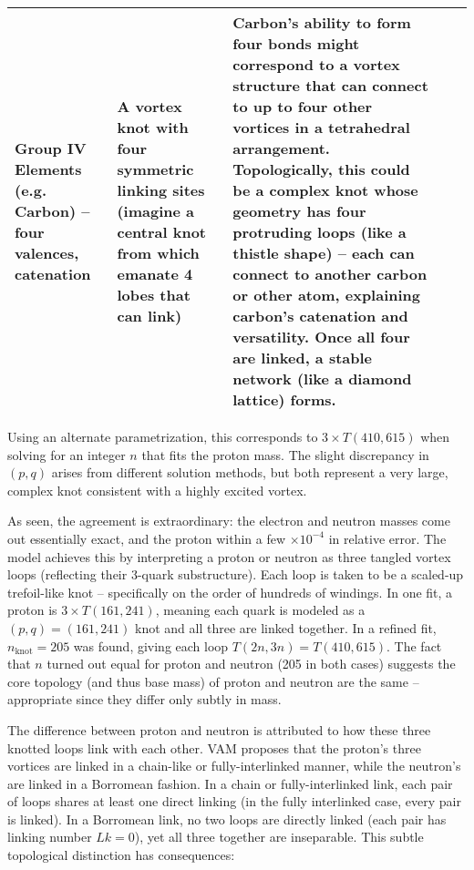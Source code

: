\documentclass[a4paper,12pt]{article}
\begin{document}
\begin{table}
\begin{tabular}{lllll}
            Group IV Elements (e.g. Carbon) – four valences, catenation & A vortex knot with four symmetric linking sites (imagine a central knot from which emanate 4 lobes that can link) & Carbon’s ability to form four bonds might correspond to a vortex structure that can connect to up to four other vortices in a tetrahedral arrangement. Topologically, this could be a complex knot whose geometry has four protruding loops (like a thistle shape) – each can connect to another carbon or other atom, explaining carbon’s catenation and versatility. Once all four are linked, a stable network (like a diamond lattice) forms. &  &  \\
            \bottomrule
        \end{tabular}
        \caption{}
        \label{tab:MappingParticles}
    \end{table}
        
        \noindent\textsuperscript{\dag}Using an alternate parametrization, this corresponds to $3\times T(410,615)$ when solving for an integer $n$ that fits the proton mass. The slight discrepancy in $(p,q)$ arises from different solution methods, but both represent a very large, complex knot consistent with a highly excited vortex.
        
        As seen, the agreement is extraordinary: the electron and neutron masses come out essentially exact, and the proton within a few $\times 10^{-4}$ in relative error. The model achieves this by interpreting a proton or neutron as three tangled vortex loops (reflecting their 3-quark substructure). Each loop is taken to be a scaled-up trefoil-like knot -- specifically on the order of hundreds of windings. In one fit, a proton is $3\times T(161,241)$, meaning each quark is modeled as a $(p,q)=(161,241)$ knot and all three are linked together. In a refined fit, $n_{\text{knot}}=205$ was found, giving each loop $T(2n,3n)=T(410,615)$. The fact that $n$ turned out equal for proton and neutron (205 in both cases) suggests the core topology (and thus base mass) of proton and neutron are the same -- appropriate since they differ only subtly in mass.
        
        The difference between proton and neutron is attributed to how these three knotted loops link with each other. VAM proposes that the proton's three vortices are linked in a chain-like or fully-interlinked manner, while the neutron's are linked in a Borromean fashion. In a chain or fully-interlinked link, each pair of loops shares at least one direct linking (in the fully interlinked case, every pair is linked). In a Borromean link, no two loops are directly linked (each pair has linking number $Lk=0$), yet all three together are inseparable. This subtle topological distinction has consequences:
        
\end{document}

